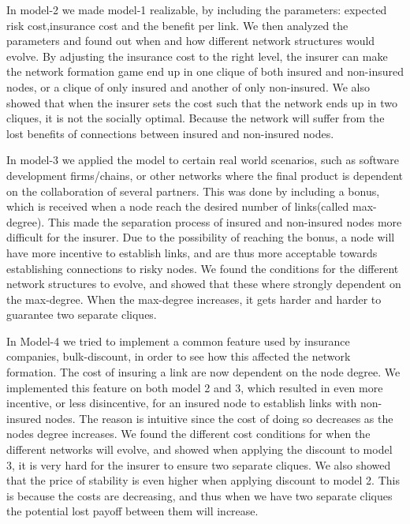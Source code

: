  In model-2 we made model-1 realizable, by including the parameters: expected risk cost,insurance cost and the benefit per link. We then analyzed the parameters and found out when and how different network structures would evolve. By adjusting the insurance cost to the right level, the insurer can make the network formation game end up in one clique of both insured and non-insured nodes, or a clique of only insured and another of only non-insured. 
We also showed that when the insurer sets the cost such that the network ends up in two cliques, it is not the socially optimal. Because the network will suffer from the lost benefits of connections between insured and non-insured nodes. 

In model-3 we applied the model to certain real world scenarios, such as software development firms/chains, or other networks where the final product is dependent on the collaboration of several partners.
This was done by including a bonus, which is received when a node reach the desired number of links(called max-degree). This made the separation process of insured and non-insured nodes more difficult for the insurer. Due to the possibility of reaching the bonus, a node will have more incentive to establish links, and are thus more acceptable towards establishing connections to risky nodes. We found the conditions for the different network structures to evolve, and showed that these where strongly dependent on the max-degree. When the max-degree increases, it gets harder and harder to guarantee two separate cliques.

In Model-4 we tried to implement a common feature used by insurance companies, bulk-discount, in order to see how this affected the network formation. The cost of insuring a link are now dependent on the node degree. We implemented this feature on both model 2 and 3, which resulted in even more incentive, or less disincentive, for an insured node to establish links with non-insured nodes. The reason is intuitive since the cost of doing so decreases as the nodes degree increases. 
We found the different cost conditions for when the different networks will evolve, and showed when applying the discount to model 3, it is very hard for the insurer to ensure two separate cliques. 
We also showed that the price of stability is even higher when applying discount to model 2. This is because the costs are decreasing, and thus when we have two separate cliques the potential lost payoff between them will increase. 

